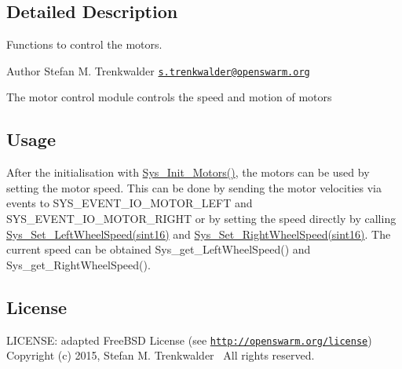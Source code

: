 \subsection{Detailed Description}
Functions to control the motors. 

\begin{DoxyAuthor}{Author}
Stefan M. Trenkwalder \href{mailto:s.trenkwalder@openswarm.org}{\tt s.\+trenkwalder@openswarm.\+org}
\end{DoxyAuthor}
The motor control module controls the speed and motion of motors\hypertarget{group__motors_motors_usage}{}\subsection{Usage}\label{group__motors_motors_usage}
After the initialisation with \hyperlink{motors_8h_ab35833b8a72da88c16285b4ff4d24eb5}{Sys\+\_\+\+Init\+\_\+\+Motors()}, the motors can be used by setting the motor speed. This can be done by sending the motor velocities via events to S\+Y\+S\+\_\+\+E\+V\+E\+N\+T\+\_\+\+I\+O\+\_\+\+M\+O\+T\+O\+R\+\_\+\+L\+E\+F\+T and S\+Y\+S\+\_\+\+E\+V\+E\+N\+T\+\_\+\+I\+O\+\_\+\+M\+O\+T\+O\+R\+\_\+\+R\+I\+G\+H\+T or by setting the speed directly by calling \hyperlink{motors_8h_a3bd56e9540443f08d15bdef558e77dd5}{Sys\+\_\+\+Set\+\_\+\+Left\+Wheel\+Speed(sint16)} and \hyperlink{motors_8h_a497d00bbd91ce1308c6e6d15d16b482d}{Sys\+\_\+\+Set\+\_\+\+Right\+Wheel\+Speed(sint16)}. The current speed can be obtained Sys\+\_\+get\+\_\+\+Left\+Wheel\+Speed() and Sys\+\_\+get\+\_\+\+Right\+Wheel\+Speed().\hypertarget{group__motors_motors_license}{}\subsection{License}\label{group__motors_motors_license}
L\+I\+C\+E\+N\+S\+E\+: adapted Free\+B\+S\+D License (see \href{http://openswarm.org/license}{\tt http\+://openswarm.\+org/license})~\newline
Copyright (c) 2015, Stefan M. Trenkwalder~\newline
All rights reserved. 